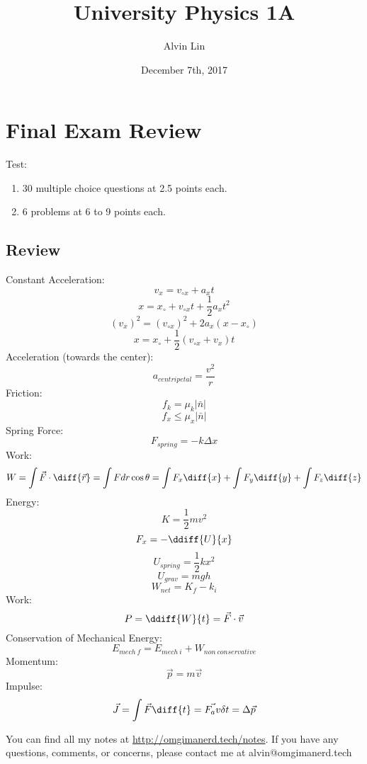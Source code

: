 \documentclass{math}
\title{University Physics 1A}
\author{Alvin Lin}
\date{December 7th, 2017}
\begin{document}
\maketitle

\section*{Final Exam Review}
Test:
\begin{enumerate}
  \item 30 multiple choice questions at 2.5 points each.
  \item 6 problems at 6 to 9 points each.
\end{enumerate}

\subsection*{Review}
Constant Acceleration:
\[ v_x = v_{\circ x}+a_xt \]
\[ x = x_{\circ}+v_{\circ x}t+\frac{1}{2}a_xt^2 \]
\[ (v_x)^2 = (v_{\circ x})^2+2a_x(x-x_{\circ}) \]
\[ x = x_{\circ}+\frac{1}{2}(v_{\circ x}+v_x)t \]
Acceleration (towards the center):
\[ a_{centripetal} = \frac{v^2}{r} \]
Friction:
\[ f_k = \mu_k|\bar{n}| \]
\[ f_x \le \mu_x|\bar{n}| \]
Spring Force:
\[ F_{spring} = -k\Delta x \]
Work:
\[ W = \int\vec{F}\cdot\diff{\vec{r}} = \int Fdr\cos\theta =
  \int F_x\diff{x}+\int F_y\diff{y}+\int F_z\diff{z} \]
Energy:
\[ K = \frac{1}{2}mv^2 \]
\[ F_x = -\ddiff{U}{x} \]
\[ U_{spring} = \frac{1}{2}kx^2 \]
\[ U_{grav} = mgh \]
\[ W_{net} = K_f-k_i \]
Work:
\[ P = \ddiff{W}{t} = \vec{F}\cdot\vec{v} \]
Conservation of Mechanical Energy:
\[ E_{mech~f} = E_{mech~i}+W_{non~conservative} \]
Momentum:
\[ \vec{p} = m\vec{v} \]
Impulse:
\[ \vec{J} = \int\vec{F}\diff{t} = \vec{F_av}\delta t = \Delta\vec{p} \]


\begin{center}
  You can find all my notes at \url{http://omgimanerd.tech/notes}. If you have
  any questions, comments, or concerns, please contact me at
  alvin@omgimanerd.tech
\end{center}
\end{document}
